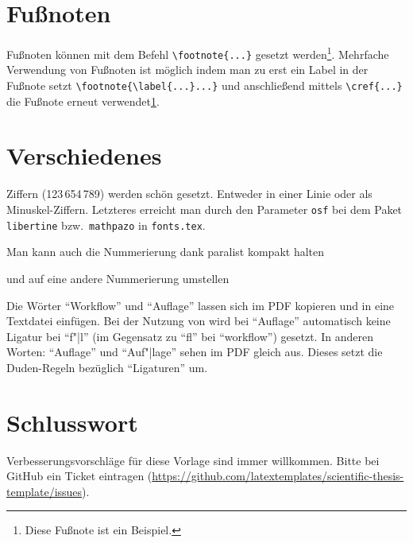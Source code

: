 \section{Fußnoten}
Fußnoten können mit dem Befehl \verb+\footnote{...}+ gesetzt werden\footnote{\label{fussnote}Diese Fußnote ist ein Beispiel.
}.
Mehrfache Verwendung von Fußnoten ist möglich indem man zu erst ein Label in der Fußnote setzt \verb+\footnote{\label{...}...}+ und anschließend mittels \verb+\cref{...}+ die Fußnote erneut verwendet\cref{fussnote}.


\section{Verschiedenes}
\label{sec:diff}
\ifdeutsch
  Ziffern (123\,654\,789) werden schön gesetzt.
  Entweder in einer Linie oder als Minuskel-Ziffern.
  Letzteres erreicht man durch den Parameter \texttt{osf} bei dem Paket \texttt{libertine} bzw.\ \texttt{mathpazo} in \texttt{fonts.tex}.
\fi

\begin{compactenum}[I.]
  \item Man kann auch die Nummerierung dank paralist kompakt halten
  \item und auf eine andere Nummerierung umstellen
\end{compactenum}

Die Wörter \enquote{Workflow} und \enquote{Auflage} lassen sich im PDF kopieren und in eine Textdatei einfügen.
Bei der Nutzung von \LuaLaTeX{} wird bei \enquote{Auflage} automatisch keine Ligatur bei \enquote{f"|l} (im Gegensatz zu \enquote{fl} bei \enquote{workflow}) gesetzt.
In anderen Worten: \enquote{Auflage} und \enquote{Auf"|lage} sehen im PDF gleich aus.
Dieses setzt die Duden-Regeln bezüglich \enquote{Ligaturen} \cite[S.\ 96]{Duden2001} um.

\section{Schlusswort}
Verbesserungsvorschläge für diese Vorlage sind immer willkommen.
Bitte bei GitHub ein Ticket eintragen (\url{https://github.com/latextemplates/scientific-thesis-template/issues}).
